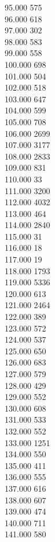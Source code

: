 { 95.000	575 \\
 96.000	618 \\
 97.000	302 \\
 98.000	583 \\
 99.000	558 \\
 100.000	698 \\
 101.000	504 \\
 102.000	518 \\
 103.000	647 \\
 104.000	599 \\
 105.000	708 \\
 106.000	2699 \\
 107.000	3177 \\
 108.000	2833 \\
 109.000	831 \\
 110.000	33 \\
 111.000	3200 \\
 112.000	4032 \\
 113.000	464 \\
 114.000	2840 \\
 115.000	31 \\
 116.000	18 \\
 117.000	19 \\
 118.000	1793 \\
 119.000	5336 \\
 120.000	613 \\
 121.000	2464 \\
 122.000	389 \\
 123.000	572 \\
 124.000	537 \\
 125.000	650 \\
 126.000	683 \\
 127.000	579 \\
 128.000	429 \\
 129.000	552 \\
 130.000	608 \\
 131.000	533 \\
 132.000	552 \\
 133.000	1251 \\
 134.000	550 \\
 135.000	411 \\
 136.000	555 \\
 137.000	616 \\
 138.000	607 \\
 139.000	474 \\
 140.000	711 \\
 141.000	580 \\
}
